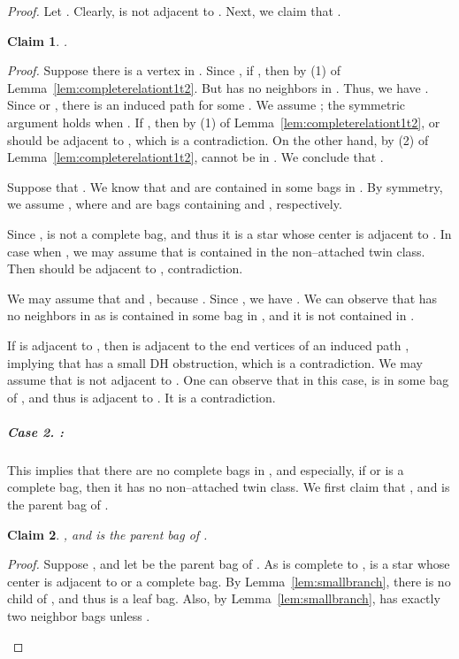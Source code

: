 \documentclass[11pt]{elsarticle}
\newtheorem{claim}{Claim}
\newenvironment{clproof}{\begin{list}{}{\setlength{\leftmargin}{5mm}} \item {\it Proof.} }{\hfill\end{list}\medskip}
\begin{document}
\begin{proof}
Let .
Clearly,  is not adjacent to .
Next, we claim that .

\begin{claim}
.
\end{claim}
\begin{clproof}
Suppose there is a vertex  in . 
Since , if , then  by (1) of Lemma~\ref{lem:completerelationt1t2}. 
But  has no neighbors in . Thus, we have .
Since  or , there is an induced path  for some .
We assume ; the symmetric argument holds when .
If , then by (1) of Lemma~\ref{lem:completerelationt1t2},  or  should be adjacent to , which is a contradiction.
On the other hand, by (2) of Lemma~\ref{lem:completerelationt1t2},  cannot be in .
We conclude that .
\end{clproof}


Suppose that . 
We know that  and  are contained in some bags in .
By symmetry, we assume , where  and  are bags containing  and , respectively.

Since ,  is not a complete bag, and thus it is a star whose center is adjacent to .
In case when , we may assume that  is contained in the non--attached twin class. 
Then  should be adjacent to , contradiction.

We may assume that  and , because . Since , we have .
We can observe that  has no neighbors in  as  is contained in some bag in , and it is not contained in .

If  is adjacent to , 
then  is adjacent to the end vertices of an induced path , implying that  has a small DH obstruction, which is a contradiction.
We may assume that  is not adjacent to .
One can observe that in this case,  is in some bag of , and thus
 is adjacent to . It is a contradiction.




\subparagraph{\textbf{Case 2.}  :}  
This implies that there are no complete bags in , and especially, if  or  is a complete bag, then it has no non--attached twin class.
We first claim that ,  and  is the parent bag of .

\begin{claim}
,  and  is the parent bag of .
\end{claim}
\begin{clproof}
Suppose , and let  be the parent bag of .
As  is complete to , 
 is a star whose center is adjacent to  or a complete bag. 
By Lemma~\ref{lem:smallbranch}, there is no child of , and thus  is a leaf bag.
Also, by Lemma~\ref{lem:smallbranch},  has exactly two neighbor bags unless .


\end{clproof}
\end{proof}
\end{document}
